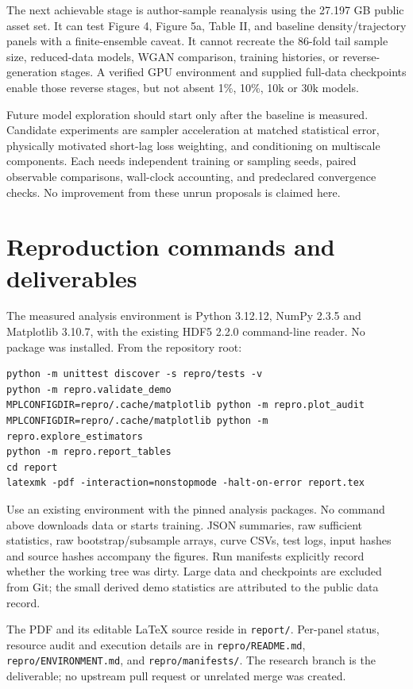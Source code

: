 \documentclass[10pt,a4paper]{article}
\begin{document}
The next achievable stage is author-sample reanalysis using the 27.197 GB public asset set. It can test Figure 4, Figure 5a, Table II, and baseline density/trajectory panels with a finite-ensemble caveat. It cannot recreate the 86-fold tail sample size, reduced-data models, WGAN comparison, training histories, or reverse-generation stages. A verified GPU environment and supplied full-data checkpoints enable those reverse stages, but not absent 1\%, 10\%, 10k or 30k models.

Future model exploration should start only after the baseline is measured. Candidate experiments are sampler acceleration at matched statistical error, physically motivated short-lag loss weighting, and conditioning on multiscale components. Each needs independent training or sampling seeds, paired observable comparisons, wall-clock accounting, and predeclared convergence checks. No improvement from these unrun proposals is claimed here.

\section{Reproduction commands and deliverables}
The measured analysis environment is Python 3.12.12, NumPy 2.3.5 and Matplotlib 3.10.7, with the existing HDF5 2.2.0 command-line reader. No package was installed. From the repository root:
\begin{verbatim}
python -m unittest discover -s repro/tests -v
python -m repro.validate_demo
MPLCONFIGDIR=repro/.cache/matplotlib python -m repro.plot_audit
MPLCONFIGDIR=repro/.cache/matplotlib python -m repro.explore_estimators
python -m repro.report_tables
cd report
latexmk -pdf -interaction=nonstopmode -halt-on-error report.tex
\end{verbatim}
Use an existing environment with the pinned analysis packages. No command above downloads data or starts training. JSON summaries, raw sufficient statistics, raw bootstrap/subsample arrays, curve CSVs, test logs, input hashes and source hashes accompany the figures. Run manifests explicitly record whether the working tree was dirty. Large data and checkpoints are excluded from Git; the small derived demo statistics are attributed to the public data record.

The PDF and its editable LaTeX source reside in \texttt{report/}. Per-panel status, resource audit and execution details are in \texttt{repro/README.md}, \texttt{repro/ENVIRONMENT.md}, and \texttt{repro/manifests/}. The research branch is the deliverable; no upstream pull request or unrelated merge was created.
\end{document}
